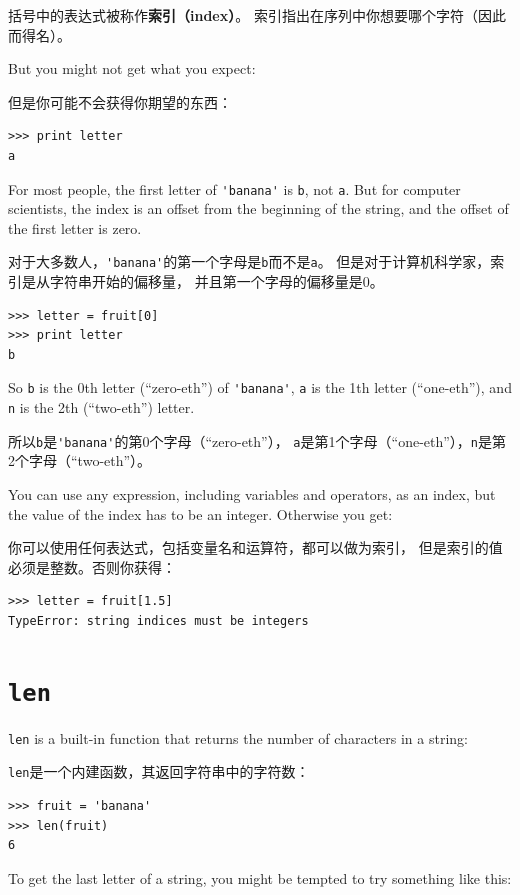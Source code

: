 \documentclass[10pt]{book}
\begin{document}
\begin{CJK}{UTF8}{gbsn}
括号中的表达式被称作{\bf 索引（index）}。
索引指出在序列中你想要哪个字符（因此而得名）。

But you might not get what you expect:

但是你可能不会获得你期望的东西：

\begin{verbatim}
>>> print letter
a
\end{verbatim}
%
For most people, the first letter of \verb"'banana'" is {\tt b}, not
{\tt a}.  But for computer scientists, the index is an offset from the
beginning of the string, and the offset of the first letter is zero.

对于大多数人，\verb"'banana'"的第一个字母是{\tt b}而不是{\tt a}。
但是对于计算机科学家，索引是从字符串开始的偏移量，
并且第一个字母的偏移量是0。

\begin{verbatim}
>>> letter = fruit[0]
>>> print letter
b
\end{verbatim}
%
So {\tt b} is the 0th letter (``zero-eth'') of \verb"'banana'", {\tt a}
is the 1th letter (``one-eth''), and {\tt n} is the 2th (``two-eth'')
letter.

所以{\tt b}是\verb"'banana'"的第0个字母（``zero-eth''），
{\tt a}是第1个字母（``one-eth''），{\tt n}是第2个字母（``two-eth''）。

You can use any expression, including variables and operators, as an
index, but the value of the index has to be an integer.  Otherwise you
get:

你可以使用任何表达式，包括变量名和运算符，都可以做为索引，
但是索引的值必须是整数。否则你获得：

\begin{verbatim}
>>> letter = fruit[1.5]
TypeError: string indices must be integers
\end{verbatim}
%

\section{{\tt len}}

{\tt len} is a built-in function that returns the number of characters
in a string:

{\tt len}是一个内建函数，其返回字符串中的字符数：

\begin{verbatim}
>>> fruit = 'banana'
>>> len(fruit)
6
\end{verbatim}
%
To get the last letter of a string, you might be tempted to try something
like this:


\end{CJK}
\end{document}
